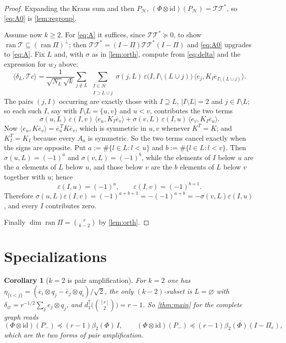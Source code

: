 \documentclass[11pt,reqno]{amsart}
\theoremstyle{plain}
\newtheorem{corollary}[theorem]{Corollary}
\theoremstyle{remark}
\newcommand{\id}{\mathrm{id}}
\newcommand{\ip}[2]{\langle #1,#2\rangle}
\newcommand{\abs}[1]{\lvert #1\rvert}
\begin{document}
\begin{proof}
Expanding the Kraus sum and then $P_{\mathcal H}$,
$(\Phi\otimes\id)(P_{\mathcal H})=\mathcal T\mathcal T^*$, so
\cref{eq:A0} is \cref{lem:regroup}.

Assume now $k\ge2$.  For \cref{eq:A} it suffices, since
$\mathcal T\mathcal T^*\succeq0$, to show
$\operatorname{ran}\mathcal T\subseteq(\operatorname{ran}\Pi)^\perp$; then
$\mathcal T\mathcal T^*=(I-\Pi)\mathcal T\mathcal T^*(I-\Pi)$ and \cref{eq:A0}
upgrades to \cref{eq:A}.  Fix $L$ and, with $\sigma$ as in \cref{lem:orth},
compute from \cref{eq:delta} and the expression for $w_J$ above:
\[
    \ip{\delta_L}{\mathcal Tc}
    =\frac1{\sqrt{N_L}\sqrt k}
      \sum_{j\notin L}\ \sum_{\substack{I\in\mathcal H\\ I\supset L\cup j}}
      \sigma(j,L)\,\varepsilon\bigl(I,I\setminus(L\cup j)\bigr)\,
      \ip{e_j}{K_I\overline e_{I\setminus(L\cup j)}} .
\]
The pairs $(j,I)$ occurring are exactly those with $I\supseteq L$,
$\abs{I\setminus L}=2$ and $j\in I\setminus L$; so each such $I$, say with
$I\setminus L=\{u,v\}$ and $u<v$, contributes the two terms
\[
    \sigma(u,L)\,\varepsilon(I,v)\,\ip{e_u}{K_I\overline e_v}
    +\sigma(v,L)\,\varepsilon(I,u)\,\ip{e_v}{K_I\overline e_u} .
\]
Now $\ip{e_u}{K\overline e_v}=\overline e_u^{\,T}K\overline e_v$, which is
symmetric in $u,v$ whenever $K^T=K$; and $K_I^T=K_I$ because every $A_a$ is
symmetric.  So the two terms cancel exactly when the signs are opposite.  Put
$a:=\#\{l\in L:l<u\}$ and $b:=\#\{l\in L:l<v\}$.  Then
$\sigma(u,L)=(-1)^a$ and $\sigma(v,L)=(-1)^b$, while the elements of $I$ below
$u$ are the $a$ elements of $L$ below $u$, and those below $v$ are the $b$
elements of $L$ below $v$ together with $u$; hence
\[
    \varepsilon(I,u)=(-1)^{a},
    \qquad
    \varepsilon(I,v)=(-1)^{b+1}.
\]
Therefore
$\sigma(u,L)\varepsilon(I,v)=(-1)^{a+b+1}
=-(-1)^{a+b}=-\sigma(v,L)\varepsilon(I,u)$, and every $I$ contributes zero.

Finally $\dim\operatorname{ran}\Pi=\binom r{k-2}$ by \cref{lem:orth}.
\end{proof}

\section{Specializations}

\begin{corollary}[$k=2$ is pair amplification]
\label{cor:k2}
For $k=2$ one has $\eta_{\{i<j\}}=(\overline e_i\otimes q_j-\overline e_j\otimes q_i)/\sqrt2$,
the only $(k-2)$-subset is $L=\varnothing$ with
$\delta_\varnothing=r^{-1/2}\sum_je_j\otimes q_j$, and
$d^\uparrow_1\bigl(\binom{[r]}2\bigr)=r-1$.  So \cref{thm:main} for the complete
graph reads
\[
    (\Phi\otimes\id)(P_-)\preceq(r-1)\beta_2(\Phi)\,I,
    \qquad
    (\Phi\otimes\id)(P_-)\preceq(r-1)\beta_2(\Phi)(I-\Pi_e),
\]
which are the two forms of pair amplification.
\end{corollary}
\end{document}

